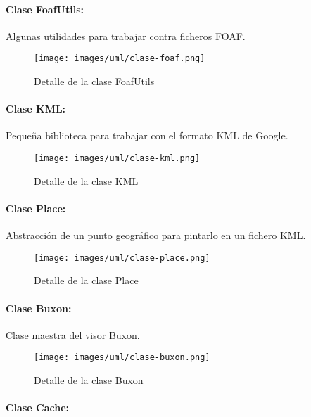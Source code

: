 \paragraph{Clase FoafUtils:}

Algunas utilidades para trabajar contra ficheros FOAF.

\begin{figure}[H]
	\centering
 	\texttt{[image: images/uml/clase-foaf.png]}
	\caption{Detalle de la clase FoafUtils}
	\label{fig:uml:foafutils-class}
\end{figure}

\paragraph{Clase KML:}

Pequeña biblioteca para trabajar con el formato KML de Google.

\begin{figure}[H]
	\centering
 	\texttt{[image: images/uml/clase-kml.png]}
	\caption{Detalle de la clase KML}
	\label{fig:uml:kml-class}
\end{figure}

\paragraph{Clase Place:}

Abstracción de un punto geográfico para pintarlo en un fichero KML.

\begin{figure}[H]
	\centering
 	\texttt{[image: images/uml/clase-place.png]}
	\caption{Detalle de la clase Place}
	\label{fig:uml:place-class}
\end{figure}

\paragraph{Clase Buxon:}

Clase maestra del visor Buxon.

\begin{figure}[H]
	\centering
 	\texttt{[image: images/uml/clase-buxon.png]}
	\caption{Detalle de la clase Buxon}
	\label{fig:uml:buxon-class}
\end{figure}

\paragraph{Clase Cache:}

